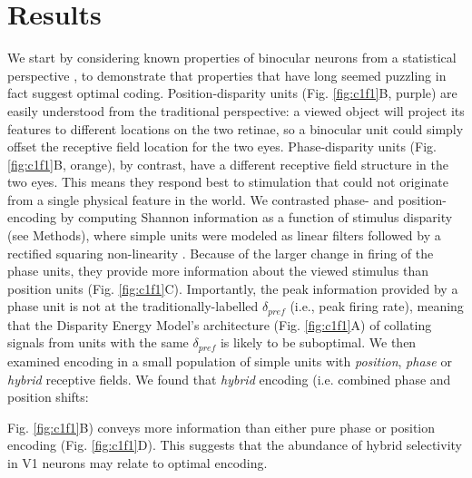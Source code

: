 \section{Results}

We start by considering known properties of binocular neurons from a statistical perspective \cite{Shannon1948}, to demonstrate that properties that have long seemed puzzling in fact suggest optimal coding. Position-disparity units (Fig. \ref{fig:c1f1}B, purple) are easily understood from the traditional perspective: a viewed object will project its features to different locations on the two retinae, so a binocular unit could simply offset the receptive field location for the two eyes. Phase-disparity units (Fig. \ref{fig:c1f1}B, orange), by contrast, have a different receptive field structure in the two eyes. This means they respond best to stimulation that could not originate from a single physical feature in the world. We contrasted phase- and position- encoding by computing Shannon information \cite{Shannon1948} as a function of stimulus disparity (see Methods), where simple units were modeled as linear filters followed by a rectified squaring non-linearity \cite{Ohzawa:1990cq}. Because of the larger change in firing of the phase units, they provide more information about the viewed stimulus than position units (Fig. \ref{fig:c1f1}C). Importantly, the peak information provided by a phase unit is not at the traditionally-labelled $\delta_{pref}$ (i.e., peak firing rate), meaning that the Disparity Energy Model's architecture (Fig. \ref{fig:c1f1}A) of collating signals from units with the same $\delta_{pref}$ is likely to be suboptimal. We then examined encoding in a small population of simple units with \emph {position}, \emph {phase} or \emph {hybrid} receptive fields. We found that \emph {hybrid} encoding (i.e. combined phase and position shifts: {Fig. \ref{fig:c1f1}B) conveys more information than either pure phase or position encoding (Fig. \ref{fig:c1f1}D). This suggests that the abundance of hybrid selectivity in V1 neurons \cite{DeAngelis:1991mb, Prince:2002uq, Tsao:2003pi} may relate to optimal encoding. 

}
